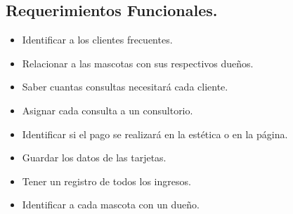 \documentclass{exam}
\begin{document}
    \subsection{Requerimientos Funcionales.}
        \begin{itemize}
            \item Identificar a los clientes frecuentes.
            \item Relacionar a las mascotas con sus respectivos dueños.
            \item Saber cuantas consultas necesitará cada cliente.
            \item Asignar cada consulta a un consultorio.
            \item Identificar si el pago se realizará en la estética o en la página.
            \item Guardar los datos de las tarjetas.
            \item Tener un registro de todos los ingresos.
            \item Identificar a cada mascota con un dueño.
        \end{itemize}
\end{document}
